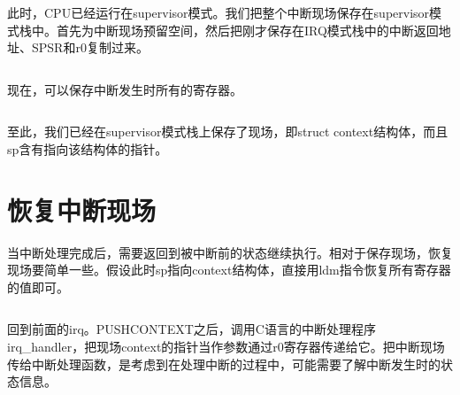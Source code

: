 \documentclass[main.tex]{subfiles}
\begin{document}
\begin{CJK*}{UTF8}{song}
\begin{code}
\label{code:3-10}
\inputminted[firstline=49,lastline=52,linenos,numbersep=5pt,frame=lines,framesep=2mm]{gas}{src/chapter03/kernel/entry.S}
\end{code}

此时，CPU已经运行在supervisor模式。我们把整个中断现场保存在supervisor模式栈中。首先为中断现场预留空间，然后把刚才保存在IRQ模式栈中的中断返回地址、SPSR和r0复制过来。

\begin{code}
\label{code:3-11}
\inputminted[firstline=53,lastline=59,linenos,numbersep=5pt,frame=lines,framesep=2mm]{gas}{src/chapter03/kernel/entry.S}
\end{code}

现在，可以保存中断发生时所有的寄存器。
\begin{code}
\label{code:3-12}
\inputminted[firstline=60,lastline=63,linenos,numbersep=5pt,frame=lines,framesep=2mm]{gas}{src/chapter03/kernel/entry.S}
\end{code}
至此，我们已经在supervisor模式栈上保存了现场，即struct context结构体，而且sp含有指向该结构体的指针。

\section{恢复中断现场}
当中断处理完成后，需要返回到被中断前的状态继续执行。相对于保存现场，恢复现场要简单一些。假设此时sp指向context结构体，直接用ldm指令恢复所有寄存器的值即可。

\begin{code}
\label{code:3-13}
\inputminted[firstline=65,lastline=71,linenos,numbersep=5pt,frame=lines,framesep=2mm]{gas}{src/chapter03/kernel/entry.S}
\end{code}

回到前面的irq。PUSHCONTEXT之后，调用C语言的中断处理程序irq\_handler，把现场context的指针当作参数通过r0寄存器传递给它。把中断现场传给中断处理函数，是考虑到在处理中断的过程中，可能需要了解中断发生时的状态信息。

\begin{code}
\label{code:3-14}
\inputminted[firstline=147,lastline=153,linenos,numbersep=5pt,frame=lines,framesep=2mm]{gas}{src/chapter03/kernel/entry.S}
\end{code}


\end{CJK*}
\end{document}
